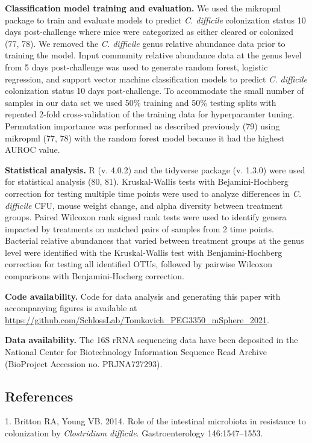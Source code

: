 \documentclass[
  11pt,
]{article}
\begin{document}
\textbf{Classification model training and evaluation.} We used the
mikropml package to train and evaluate models to predict \emph{C.
difficile} colonization status 10 days post-challenge where mice were
categorized as either cleared or colonized (77, 78). We removed the
\emph{C. difficile} genus relative abundance data prior to training the
model. Input community relative abundance data at the genus level from 5
days post-challenge was used to generate random forest, logistic
regression, and support vector machine classification models to predict
\emph{C. difficile} colonization status 10 days post-challenge. To
accommodate the small number of samples in our data set we used 50\%
training and 50\% testing splits with repeated 2-fold cross-validation
of the training data for hyperparamter tuning. Permutation importance
was performed as described previously (79) using mikropml (77, 78) with
the random forest model because it had the highest AUROC value.

\textbf{Statistical analysis.} R (v. 4.0.2) and the tidyverse package
(v. 1.3.0) were used for statistical analysis (80, 81). Kruskal-Wallis
tests with Bejamini-Hochberg correction for testing multiple time points
were used to analyze differences in \emph{C. difficile} CFU, mouse
weight change, and alpha diversity between treatment groups. Paired
Wilcoxon rank signed rank tests were used to identify genera impacted by
treatments on matched pairs of samples from 2 time points. Bacterial
relative abundances that varied between treatment groups at the genus
level were identified with the Kruskal-Wallis test with
Benjamini-Hochberg correction for testing all identified OTUs, followed
by pairwise Wilcoxon comparisons with Benjamini-Hocherg correction.

\textbf{Code availability.} Code for data analysis and generating this
paper with accompanying figures is available at
\url{https://github.com/SchlossLab/Tomkovich_PEG3350_mSphere_2021}.

\textbf{Data availability.} The 16S rRNA sequencing data have been
deposited in the National Center for Biotechnology Information Sequence
Read Archive (BioProject Accession no. PRJNA727293).

\newpage

\hypertarget{references}{%
\subsection{References}\label{references}}

\hypertarget{refs}{}
\leavevmode\hypertarget{ref-Britton2014}{}%
1. Britton RA, Young VB. 2014. Role of the intestinal microbiota in
resistance to colonization by \emph{Clostridium difficile}.
Gastroenterology 146:1547--1553.
\end{document}
